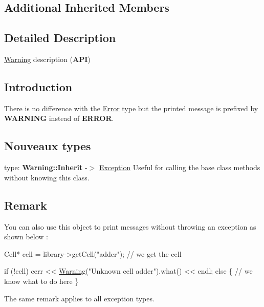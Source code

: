 \subsection*{Additional Inherited Members}


\subsection{Detailed Description}
\hyperlink{classHurricane_1_1Warning}{Warning} description ({\bfseries A\-P\-I}) 

\hypertarget{classHurricane_1_1Warning_secWarningIntro}{}\subsection{Introduction}\label{classHurricane_1_1Warning_secWarningIntro}
There is no difference with the \hyperlink{classHurricane_1_1Error}{Error} type but the printed message is prefixed by {\bfseries W\-A\-R\-N\-I\-N\-G} instead of {\bfseries E\-R\-R\-O\-R}.\hypertarget{classHurricane_1_1Warning_secWarningNouveauxTypes}{}\subsection{Nouveaux types}\label{classHurricane_1_1Warning_secWarningNouveauxTypes}
type\-: {\bfseries Warning\-::\-Inherit} -\/$>$ \hyperlink{classHurricane_1_1Exception}{Exception} Useful for calling the base class methods without knowing this class.\hypertarget{classHurricane_1_1Warning_secWarningRemark}{}\subsection{Remark}\label{classHurricane_1_1Warning_secWarningRemark}
You can also use this object to print messages without throwing an exception as shown below \-: 
\begin{DoxyCode}
Cell* cell = library->getCell(\textcolor{stringliteral}{"adder"}); \textcolor{comment}{// we get the cell}
 
\textcolor{keywordflow}{if} (!cell)
   cerr << \hyperlink{classHurricane_1_1Warning_aea7aa9bccac13e6c15b1eb3b4741ef0d}{Warning}(\textcolor{stringliteral}{"Unknown cell adder"}).what() << endl;
\textcolor{keywordflow}{else} \{
   \textcolor{comment}{// we know what to do here}
\}
\end{DoxyCode}
 The same remark applies to all exception types. 

